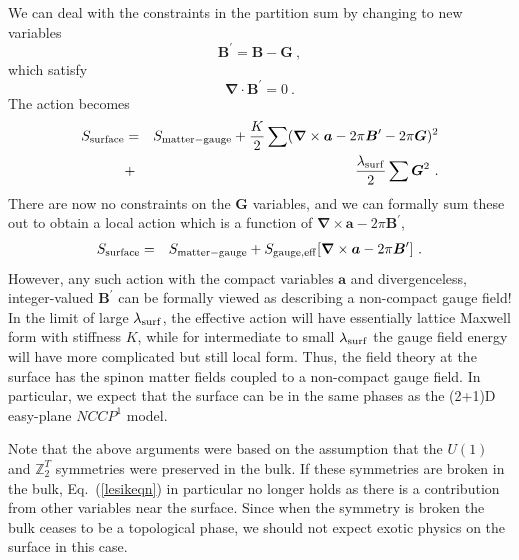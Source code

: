 \documentclass[prb,twocolumn]{revtex4-1}
\def\ztwot{\mathbb{Z}_2^T}
\begin{document}
 We can deal with the constraints in the partition sum by changing to new variables
\begin{equation}
{\bm B}^\prime = {\bm B} - {\bm G} ~,
\end{equation}
which satisfy
\begin{equation}
{\bm \nabla} \cdot {\bm B}^\prime = 0 ~.
\end{equation}
The action becomes 
\begin{eqnarray*}
S_{\rm surface} &=& S_{\rm matter-gauge} + \frac{K}{2}\sum  ({\bm\nabla} \times {\bm a}  - 2\pi {\bm B}^\prime - 2\pi {\bm G})^2 \\
 &+& \frac{\lambda_{\rm surf}}{2}\sum  {\bm G}^2 ~.
\end{eqnarray*}
There are now no constraints on the ${\bm G}$ variables, and we can formally sum these out to obtain a local action which is a function of ${\bm\nabla} \times {\bm a} - 2\pi {\bm B}^\prime$,
\begin{eqnarray*}
S_{\rm surface} &=& S_{\rm matter-gauge} + S_{\rm gauge, eff}[{\bm\nabla} \times {\bm a}  - 2\pi {\bm B}^\prime] ~.
\end{eqnarray*}
However, any such action with the compact variables ${\bm a}$ and divergenceless, integer-valued ${\bm B}^\prime$ can be formally viewed as describing a non-compact gauge field!  In the limit of large $\lambda_{\rm surf}$, the effective action will have essentially lattice Maxwell form with stiffness $K$, while for intermediate to small $\lambda_{\rm surf}$ the gauge field energy will have more complicated but still local form.  Thus, the field theory at the surface has the spinon matter fields coupled to a non-compact gauge field.  In particular, we expect that the surface can be in the same phases as the (2+1)D easy-plane $NCCP^1$ model.

Note that the above arguments were based on the assumption that the $U(1)$ and $\ztwot$ symmetries were preserved in the bulk. If these symmetries are broken in the bulk, Eq.~(\ref{lesikeqn}) in particular no longer holds as there is a contribution from other variables near the surface. Since when the symmetry is broken the bulk ceases to be a topological phase, we should not expect exotic physics on the surface in this case.

\end{document}

